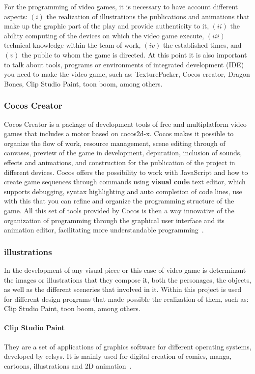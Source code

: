 \documentclass[journal,transmag]{IEEEtran}
\begin{document}
For the programming of video games, it is necessary to have account different aspects: $(i)$ the realization of illustrations the publications and animations that make up the graphic part of the play and provide authenticity to it, $(ii)$ the ability computing of the devices on which the video game execute, $(iii)$ technical knowledge within the team of work, $(iv)$ the established times, and $(v)$ the public to whom the game is directed. At this point it is also important to talk about tools, programs or environments of integrated development (IDE) you need to make the video game, such as: TexturePacker, Cocos creator, Dragon Bones, Clip Studio Paint, toon boom, among others.

\subsubsection{Cocos Creator}
Cocos Creator is a package of development tools of free and multiplatform video games that includes a motor based on cocos2d-x. Cocos makes it possible to organize the flow of work, resource management, scene editing through of canvases, preview of the game in development, depuration, inclusion of sounds, effects and animations, and construction for the publication of the project in different devices. Cocos offers the possibility to work with JavaScript and how to create game sequences through commands using \textbf{visual code} text editor, which supports debugging, syntax highlighting and auto completion of code lines, use with this that you can refine and organize the programming structure of the game. All this set of tools provided by Cocos is then a way innovative of the organization of programming through the graphical user interface and its animation editor, facilitating more understandable programming~\cite{Cocos}.

\subsubsection{illustrations}
In the development of any visual piece or this case of video game is determinant the images or illustrations that they compose it, both the personages, the objects, as well as the different sceneries that involved in it. Within this project is used for different design programs that made possible the realization of them, such as: Clip Studio Paint, toon boom, among others.

\paragraph{Clip Studio Paint} They are a set of applications of graphics software for different operating systems, developed by celsys. It is mainly used for digital creation of comics, manga, cartoons, illustrations and 2D animation~\cite{ClipP}.
\end{document}
